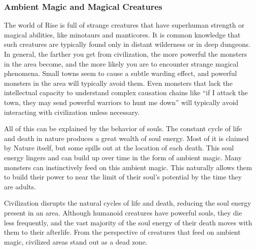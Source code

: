         \subsubsection{Ambient Magic and Magical Creatures}
            The world of Rise is full of strange creatures that have superhuman strength or magical abilities, like minotaurs and manticores.
            It is common knowledge that such creatures are typically found only in distant wilderness or in deep dungeons.
            In general, the farther you get from civilization, the more powerful the monsters in the area become, and the more likely you are to encounter strange magical phenomena.
            Small towns seem to cause a subtle warding effect, and powerful monsters in the area will typically avoid them.
            Even monsters that lack the intellectual capacity to understand complex causation chains like ``if I attack the town, they may send powerful warriors to hunt me down'' will typically avoid interacting with civilization unless necessary.

            All of this can be explained by the behavior of souls.
            The constant cycle of life and death in nature produces a great wealth of soul energy.
            Most of it is claimed by Nature itself, but some spills out at the location of each death.
            This soul energy lingers and can build up over time in the form of ambient magic.
            Many monsters can instinctively feed on this ambient magic.
            This naturally allows them to build their power to near the limit of their soul's potential by the time they are adults.

            Civilization disrupts the natural cycles of life and death, reducing the soul energy present in an area.
            Although humanoid creatures have powerful souls, they die less frequently, and the vast majority of the soul energy of their death moves with them to their afterlife.
            From the perspective of creatures that feed on ambient magic, civilized areas stand out as a dead zone.
